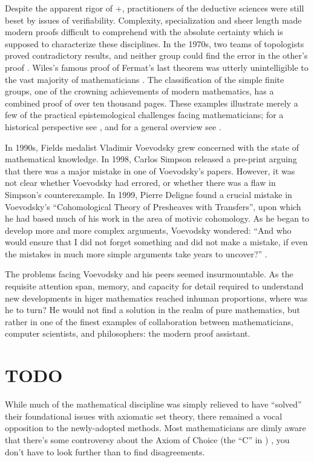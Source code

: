 \documentclass[12pt,twoside]{reedthesis}
\newcommand{\TODO}[1]{\marginpar{\footnotesize\color{TODO}todo: #1}}
\begin{document}
Despite the apparent rigor of \FOL+\ZFC,
practitioners of the deductive sciences were still beset by issues of
verifiability. Complexity, specialization and sheer length made modern proofs
difficult to comprehend with the absolute certainty which is supposed to
characterize these disciplines. In the 1970s, two teams of topologists proved
contradictory results, and neither group could find the error in the other's
proof \cite{kolata}. Wiles's famous proof of Fermat's last theorem was utterly
unintelligible to the vast majority of mathematicians \cite{nyt}. The
classification of the simple finite groups, one of the crowning achievements of
modern mathematics, has a combined proof of over ten thousand pages. These
examples illustrate merely a few of the practical epistemological challenges
facing mathematicians; for a historical perspective see \cite{rigor-and-proof},
and for a general overview see \cite{fidelity}.

In 1990s, Fields medalist Vladimir Voevodsky grew concerned with the state
of mathematical knowledge. In 1998, Carlos Simpson released a pre-print arguing
that there was a major mistake in one of Voevodsky's papers. However, it was not
clear whether Voevodsky had errored, or whether there was a flaw in Simpson's
counterexample. In 1999, Pierre Deligne found a crucial mistake in Voevodsky's
``Cohomological Theory of Presheaves with Transfers'', upon which he had based
much of his work in the area of motivic cohomology. As he began to develop more
and more complex arguments, Voevodsky wondered: ``And who would ensure that I
did not forget something and did not make a mistake, if even the mistakes in
much more simple arguments take years to uncover?'' \cite{voevodsky-ias}.

The problems facing Voevodsky and his peers seemed insurmountable.
As the requisite attention span, memory, and capacity for detail required to
understand new developments in higer mathematics reached inhuman proportions,
where was he to turn? He would not find a solution in the realm of pure
mathematics, but rather in one of the finest examples of collaboration between
mathematicians, computer scientists, and philosophers: the modern proof
assistant. \TODO{reword}

\section*{TODO}

While much of the mathematical discipline was simply relieved to have ``solved''
their foundational issues with axiomatic set theory, there remained a vocal
opposition to the newly-adopted methods. Most mathematicians are dimly aware
that there's some controversy about the Axiom of Choice (the ``C'' in
\ZFC) \cite{martin-lof-100-years}, you don't have to look further
than \FOL to find disagreements.
\end{document}
